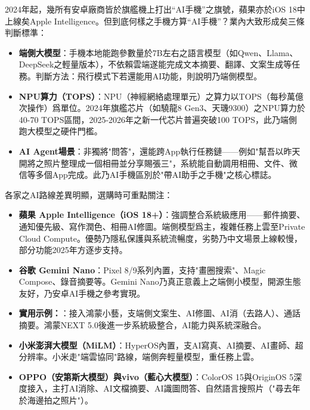 


2024年起，幾所有安卓廠商皆於旗艦機上打出“AI手機”之旗號，蘋果亦於iOS 18中上線矣Apple Intelligence。但到底何樣之手機方算“AI手機”？業內大致形成矣三條判斷標準：

\begin{itemize}
  \item \textbf{端側大模型}：手機本地能跑參數量於7B左右之語言模型（如Qwen、Llama、DeepSeek之輕量版本），不依賴雲端遂能完成文本摘要、翻譯、文案生成等任務。判斷方法：飛行模式下若還能用AI功能，則說明乃端側模型。
  \item \textbf{NPU算力（TOPS）}：NPU（神經網絡處理單元）之算力以TOPS（每秒萬億次操作）爲單位。2024年旗艦芯片（如驍龍8 Gen3、天璣9300）之NPU算力於40-70 TOPS區間，2025-2026年之新一代芯片普遍突破100 TOPS，此乃端側跑大模型之硬件門檻。
  \item \textbf{AI Agent場景}：非獨將"問答"，還能跨App執行任務鏈——例如"幫吾以昨天開將之照片整理成一個相冊並分享賜張三"，系統能自動調用相冊、文件、微信等多個App完成。此乃AI手機區別於"帶AI助手之手機"之核心標誌。
\end{itemize}


各家之AI路線差異明顯，選購時可重點關注：

\begin{itemize}
  \item \textbf{蘋果 Apple Intelligence（iOS 18+）}：強調整合系統級應用——郵件摘要、通知優先級、寫作潤色、相冊AI修圖。端側模型爲主，複雜任務上雲至Private Cloud Compute。優勢乃隱私保護與系統流暢度，劣勢乃中文場景上線較慢，部分功能2025年方逐步支持。
  \item \textbf{谷歌 Gemini Nano}：Pixel 8/9系列內置，支持"畫圈搜索"、Magic Compose、錄音摘要等。Gemini Nano乃真正意義上之端側小模型，開源生態友好，乃安卓AI手機之參考實現。
  \item \textbf{實用示例：}：接入鴻蒙小藝，支端側文案生、AI修圖、AI消（去路人）、通話摘要。鴻蒙NEXT 5.0後進一步系統級整合，AI能力與系統深融合。
  \item \textbf{小米澎湃大模型（MiLM）}：HyperOS內置，支AI寫真、AI摘要、AI畫師、超分辨率。小米走"端雲協同"路線，端側奔輕量模型，重任務上雲。
  \item \textbf{OPPO（安第斯大模型）與vivo（藍心大模型）}：ColorOS 15與OriginOS 5深度接入，主打AI消除、AI文檔摘要、AI識圖問答、自然語言搜照片（"尋去年於海邊拍之照片"）。
\end{itemize}

